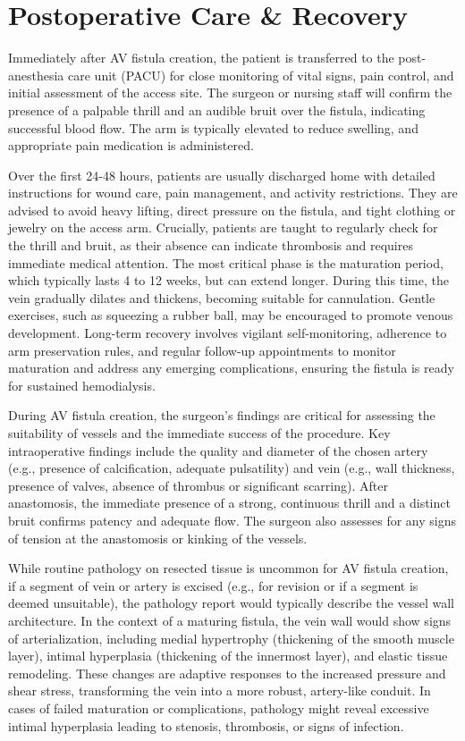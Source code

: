 \section*{Postoperative Care \& Recovery}
Immediately after AV fistula creation, the patient is transferred to the post-anesthesia care unit (PACU) for close monitoring of vital signs, pain control, and initial assessment of the access site. The surgeon or nursing staff will confirm the presence of a palpable thrill and an audible bruit over the fistula, indicating successful blood flow. The arm is typically elevated to reduce swelling, and appropriate pain medication is administered.

Over the first 24-48 hours, patients are usually discharged home with detailed instructions for wound care, pain management, and activity restrictions. They are advised to avoid heavy lifting, direct pressure on the fistula, and tight clothing or jewelry on the access arm. Crucially, patients are taught to regularly check for the thrill and bruit, as their absence can indicate thrombosis and requires immediate medical attention. The most critical phase is the maturation period, which typically lasts 4 to 12 weeks, but can extend longer. During this time, the vein gradually dilates and thickens, becoming suitable for cannulation. Gentle exercises, such as squeezing a rubber ball, may be encouraged to promote venous development. Long-term recovery involves vigilant self-monitoring, adherence to arm preservation rules, and regular follow-up appointments to monitor maturation and address any emerging complications, ensuring the fistula is ready for sustained hemodialysis.

During AV fistula creation, the surgeon's findings are critical for assessing the suitability of vessels and the immediate success of the procedure. Key intraoperative findings include the quality and diameter of the chosen artery (e.g., presence of calcification, adequate pulsatility) and vein (e.g., wall thickness, presence of valves, absence of thrombus or significant scarring). After anastomosis, the immediate presence of a strong, continuous thrill and a distinct bruit confirms patency and adequate flow. The surgeon also assesses for any signs of tension at the anastomosis or kinking of the vessels.

While routine pathology on resected tissue is uncommon for AV fistula creation, if a segment of vein or artery is excised (e.g., for revision or if a segment is deemed unsuitable), the pathology report would typically describe the vessel wall architecture. In the context of a maturing fistula, the vein wall would show signs of arterialization, including medial hypertrophy (thickening of the smooth muscle layer), intimal hyperplasia (thickening of the innermost layer), and elastic tissue remodeling. These changes are adaptive responses to the increased pressure and shear stress, transforming the vein into a more robust, artery-like conduit. In cases of failed maturation or complications, pathology might reveal excessive intimal hyperplasia leading to stenosis, thrombosis, or signs of infection.

